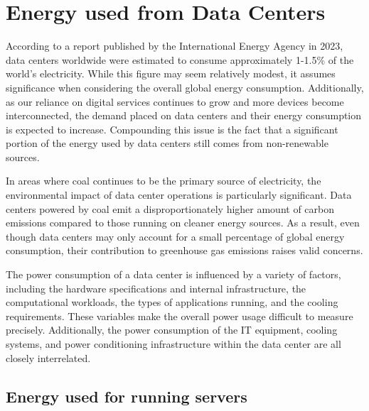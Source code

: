 \documentclass[
  a4paper,  %
  twoside,  %
  bibliography=totoc,
  headsepline,
  cleardoublepage=empty,
  parskip=half,
  draft=false
]{scrbook}
\begin{document}



\chapter{Energy used from Data Centers}

According to a report published by the International Energy Agency\cite{ieaDataCentres} in 2023, data centers worldwide were estimated to consume approximately 1-1.5\% of the world's electricity. While this figure may seem relatively modest, it assumes significance when considering the overall global energy consumption. Additionally, as our reliance on digital services continues to grow and more devices become interconnected, the demand placed on data centers and their energy consumption is expected to increase\cite{schomaker2015energy}. Compounding this issue is the fact that a significant portion of the energy used by data centers still comes from non-renewable sources\cite{ritchie2024energy}.

In areas where coal continues to be the primary source of electricity, the environmental impact of data center operations is particularly significant\cite{finkelman2021future}. Data centers powered by coal emit a disproportionately higher amount of carbon emissions compared to those running on cleaner energy sources. As a result, even though data centers may only account for a small percentage of global energy consumption, their contribution to greenhouse gas emissions raises valid concerns.

The power consumption of a data center is influenced by a variety of factors, including the hardware specifications and internal infrastructure, the computational workloads, the types of applications running, and the cooling requirements\cite{dayarathna2015data}. These variables make the overall power usage difficult to measure precisely. Additionally, the power consumption of the IT equipment, cooling systems, and power conditioning infrastructure within the data center are all closely interrelated.


\section{Energy used for running servers}
\end{document}
